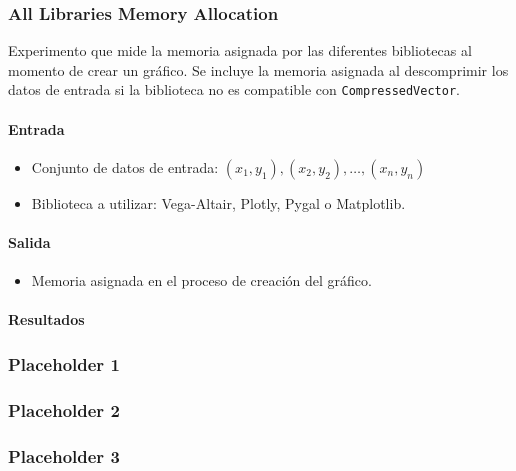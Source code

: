\subsubsection{All Libraries Memory Allocation}
\label{all_libraries_memory_allocation}

Experimento que mide la memoria asignada por las diferentes bibliotecas al momento de crear un gráfico. Se incluye la memoria asignada al descomprimir los datos de entrada si la biblioteca no es compatible con \texttt{CompressedVector}.

\paragraph{Entrada}
\begin{itemize}
    \item Conjunto de datos de entrada: \( (x_1, y_1), (x_2, y_2), \ldots, (x_n, y_n) \)
    \item Biblioteca a utilizar: Vega-Altair, Plotly, Pygal o Matplotlib.
\end{itemize}

\paragraph{Salida}
\begin{itemize}
    \item Memoria asignada en el proceso de creación del gráfico.
\end{itemize}

\paragraph{Resultados}
\vspace{0.5em}
\noindent

\alllibrariesmemoryallocationplotone
\alllibrariesmemoryallocationplotonetable

\subsubsection{Placeholder 1}
\label{vega_altair_plot_time}

\subsubsection{Placeholder 2}
\label{pygal_plot_time}

\subsubsection{Placeholder 3}
\label{vega_altair_plot_plus_build_time}


